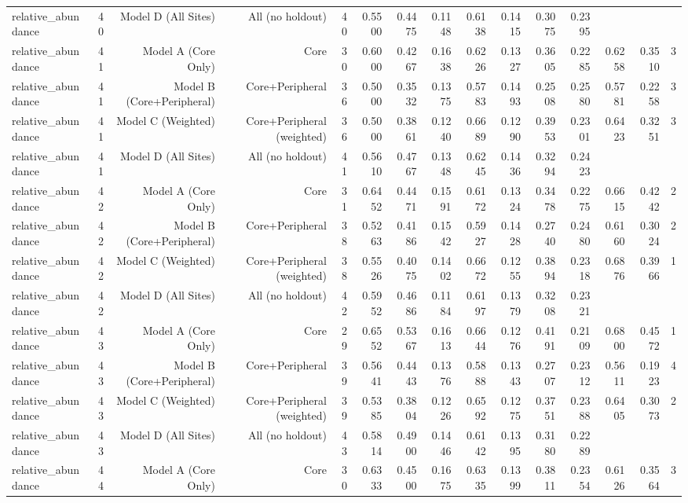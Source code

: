 {\begin{longtable}{lrrrrrrrrrrrrrr}
  relative\_abundance & 40 & Model D (All Sites) & All (no holdout) & 40 & 0.5500 & 0.4475 & 0.1148 & 0.6138 & 0.1415 & 0.3075 & 0.2395 &  &  &  \\
  relative\_abundance & 41 & Model A (Core Only) & Core & 30 & 0.6000 & 0.4267 & 0.1638 & 0.6226 & 0.1327 & 0.3605 & 0.2285 & 0.6258 & 0.3510 & 3 \\
  relative\_abundance & 41 & Model B (Core+Peripheral) & Core+Peripheral & 36 & 0.5000 & 0.3532 & 0.1375 & 0.5783 & 0.1493 & 0.2508 & 0.2580 & 0.5781 & 0.2258 & 3 \\
  relative\_abundance & 41 & Model C (Weighted) & Core+Peripheral (weighted) & 36 & 0.5000 & 0.3861 & 0.1240 & 0.6689 & 0.1290 & 0.3953 & 0.2301 & 0.6423 & 0.3251 & 3 \\
  relative\_abundance & 41 & Model D (All Sites) & All (no holdout) & 41 & 0.5610 & 0.4767 & 0.1348 & 0.6245 & 0.1436 & 0.3294 & 0.2423 &  &  &  \\
  relative\_abundance & 42 & Model A (Core Only) & Core & 31 & 0.6452 & 0.4471 & 0.1591 & 0.6172 & 0.1324 & 0.3478 & 0.2275 & 0.6615 & 0.4242 & 2 \\
  relative\_abundance & 42 & Model B (Core+Peripheral) & Core+Peripheral & 38 & 0.5263 & 0.4186 & 0.1542 & 0.5927 & 0.1428 & 0.2740 & 0.2480 & 0.6160 & 0.3024 & 2 \\
  relative\_abundance & 42 & Model C (Weighted) & Core+Peripheral (weighted) & 38 & 0.5526 & 0.4075 & 0.1402 & 0.6672 & 0.1255 & 0.3894 & 0.2318 & 0.6876 & 0.3966 & 1 \\
  relative\_abundance & 42 & Model D (All Sites) & All (no holdout) & 42 & 0.5952 & 0.4686 & 0.1184 & 0.6197 & 0.1379 & 0.3208 & 0.2321 &  &  &  \\
  relative\_abundance & 43 & Model A (Core Only) & Core & 29 & 0.6552 & 0.5367 & 0.1613 & 0.6644 & 0.1276 & 0.4191 & 0.2109 & 0.6800 & 0.4572 & 1 \\
  relative\_abundance & 43 & Model B (Core+Peripheral) & Core+Peripheral & 39 & 0.5641 & 0.4443 & 0.1376 & 0.5888 & 0.1343 & 0.2707 & 0.2312 & 0.5611 & 0.1923 & 4 \\
  relative\_abundance & 43 & Model C (Weighted) & Core+Peripheral (weighted) & 39 & 0.5385 & 0.3804 & 0.1226 & 0.6592 & 0.1275 & 0.3751 & 0.2388 & 0.6405 & 0.3073 & 2 \\
  relative\_abundance & 43 & Model D (All Sites) & All (no holdout) & 43 & 0.5814 & 0.4900 & 0.1446 & 0.6142 & 0.1395 & 0.3180 & 0.2289 &  &  &  \\
  relative\_abundance & 44 & Model A (Core Only) & Core & 30 & 0.6333 & 0.4500 & 0.1675 & 0.6335 & 0.1399 & 0.3811 & 0.2354 & 0.6126 & 0.3564 & 3 \\

\end{longtable}}
